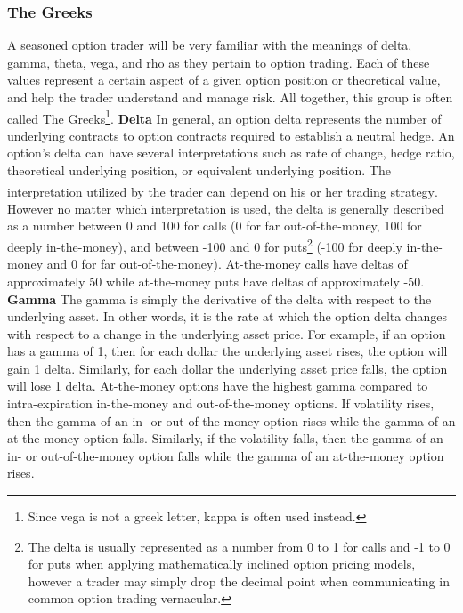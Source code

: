 \documentclass[12pt, a4paper, notitlepage]{article}
\numberwithin{equation}{subsection}
\numberwithin{figure}{subsection}
\numberwithin{table}{subsection}
\newcommand{\newpar}{\newline \newline}
\begin{document}
\subsubsection{The Greeks}\label{sec:VolAndGreeks}
A seasoned option trader will be very familiar with the meanings of delta, gamma, theta, vega, and rho as they pertain to option trading.  Each of these values represent a certain aspect of a given option position or theoretical value, and help the trader understand and manage risk.  All together, this group is often called The Greeks\footnote{Since vega is not a greek letter, kappa is often used instead.}.
\newpar
\textbf{Delta} \newline
In general, an option delta represents the number of underlying contracts to option contracts required to establish a neutral hedge.  An option's delta can have several interpretations such as rate of change, hedge ratio, theoretical underlying position, or equivalent underlying position.  The interpretation utilized by the trader can depend on his or her trading strategy\textsuperscript{\cite{Natenberg}}.  However no matter which interpretation is used, the delta is generally described as a number between 0 and 100 for calls (0 for far out-of-the-money, 100 for deeply in-the-money), and between -100 and 0 for puts\footnote{The delta is usually represented as a number from 0 to 1 for calls and -1 to 0 for puts when applying mathematically inclined option pricing models, however a trader may simply drop the decimal point when communicating in common option trading vernacular.} (-100 for deeply in-the-money and 0 for far out-of-the-money).  At-the-money calls have deltas of approximately 50 while at-the-money puts have deltas of approximately -50.
\newpar
\textbf{Gamma} \newline
The gamma is simply the derivative of the delta with respect to the underlying asset.  In other words, it is the rate at which the option delta changes with respect to a change in the underlying asset price.  For example, if an option has a gamma of 1, then for each dollar the underlying asset rises, the option will gain 1 delta.  Similarly, for each dollar the underlying asset price falls, the option will lose 1 delta.
\newpar
At-the-money options have the highest gamma compared to intra-expiration in-the-money and out-of-the-money options.  If volatility rises, then the gamma of an in- or out-of-the-money option rises while the gamma of an at-the-money option falls.  Similarly, if the volatility falls, then the gamma of an in- or out-of-the-money option falls while the gamma of an at-the-money option rises.
\end{document}
